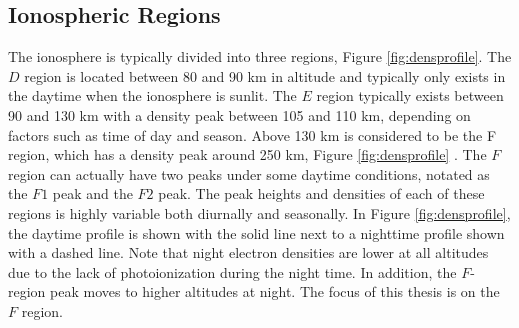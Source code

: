 \subsection{Ionospheric Regions}
\label{sec:ionosphere_regions}
The ionosphere is typically divided into three regions, Figure \ref{fig:densprofile}.  The \(D\) region is located between 80 and 90 km in altitude and typically only exists in the daytime when the ionosphere is sunlit.  The \(E\) region typically exists between 90 and 130 km with a density peak between 105 and 110 km, depending on factors such as time of day and season.  Above 130 km is considered to be the F region, which has a density peak around 250 km, Figure \ref{fig:densprofile} \citep{Kivelson1995}.  The \(F\) region can actually have two peaks under some daytime conditions, notated as the \(F1\) peak and the \(F2\) peak.  The peak heights and densities of each of these regions is highly variable both diurnally and seasonally.  In Figure \ref{fig:densprofile}, the daytime profile is shown with the solid line next to a nighttime profile shown with a dashed line.  Note that night electron densities are lower at all altitudes due to the lack of photoionization during the night time.  In addition, the \(F\)-region peak moves to higher altitudes at night.  The focus of this thesis is on the \(F\) region.

